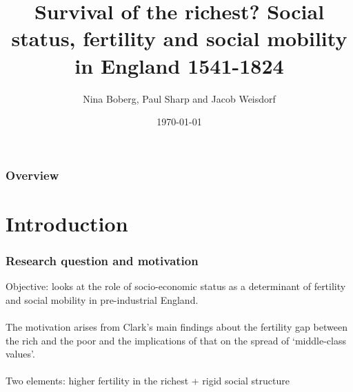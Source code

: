 \documentclass[pdftex,12pt,xcolor=pdftex,table]{beamer}
\title[Survival of the richest?]{Survival of the richest? Social status, fertility and social mobility in England 1541-1824} %
\author{Nina Boberg, Paul Sharp and Jacob Weisdorf} %
\institute[PUJ - UA] %
{
Summer School of Economics: Economic Growth and Comparative Development \\
Presented by: María Paula Castañeda and Hernando Padilla%
\medskip
}
\date{\today} %
\begin{document}
\begin{frame}
\titlepage %
\end{frame}

\begin{frame}
\frametitle{Overview} %
\tableofcontents %
\end{frame}


\section{Introduction} %


\begin{frame}
\frametitle{Research question and motivation}
 Objective: looks at the role of socio-economic status as a determinant of fertility and social mobility in pre-industrial England.\\~\\

The motivation arises from Clark's main findings about the fertility gap between the rich and the poor and the implications of that on the spread of ‘middle-class values’.\\~\\

Two elements: higher fertility in the richest + rigid social structure  
\end{frame}
\end{document}
